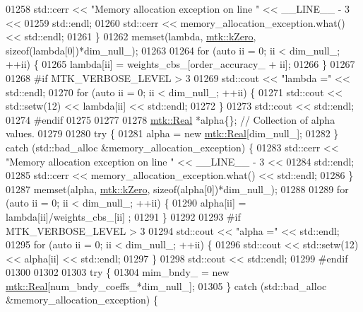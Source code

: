 \begin{DoxyCode}
{{01258     std::cerr << \textcolor{stringliteral}{"Memory allocation exception on line "} << \_\_LINE\_\_ - 3 <<
01259       std::endl;
01260     std::cerr << memory\_allocation\_exception.what() << std::endl;
01261   \}
01262   memset(lambda, \hyperlink{group__c01-roots_ga59a451a5fae30d59649bcda274fea271}{mtk::kZero}, \textcolor{keyword}{sizeof}(lambda[0])*dim\_null\_);
01263 
01264   \textcolor{keywordflow}{for} (\textcolor{keyword}{auto} ii = 0; ii < dim\_null\_; ++ii) \{
01265     lambda[ii] = weights\_cbs\_[order\_accuracy\_ + ii];
01266   \}
01267 
01268 \textcolor{preprocessor}{  #if MTK\_VERBOSE\_LEVEL > 3}
01269   std::cout << \textcolor{stringliteral}{"lambda ="} << std::endl;
01270   \textcolor{keywordflow}{for} (\textcolor{keyword}{auto} ii = 0; ii < dim\_null\_; ++ii) \{
01271     std::cout << std::setw(12) << lambda[ii] << std::endl;
01272   \}
01273   std::cout << std::endl;
01274 \textcolor{preprocessor}{  #endif}
01275 
01277 
01278   \hyperlink{group__c01-roots_gac080bbbf5cbb5502c9f00405f894857d}{mtk::Real} *alpha\{\}; \textcolor{comment}{// Collection of alpha values.}
01279 
01280   \textcolor{keywordflow}{try} \{
01281     alpha = \textcolor{keyword}{new} \hyperlink{group__c01-roots_gac080bbbf5cbb5502c9f00405f894857d}{mtk::Real}[dim\_null\_];
01282   \} \textcolor{keywordflow}{catch} (std::bad\_alloc &memory\_allocation\_exception) \{
01283     std::cerr << \textcolor{stringliteral}{"Memory allocation exception on line "} << \_\_LINE\_\_ - 3 <<
01284       std::endl;
01285     std::cerr << memory\_allocation\_exception.what() << std::endl;
01286   \}
01287   memset(alpha, \hyperlink{group__c01-roots_ga59a451a5fae30d59649bcda274fea271}{mtk::kZero}, \textcolor{keyword}{sizeof}(alpha[0])*dim\_null\_);
01288 
01289   \textcolor{keywordflow}{for} (\textcolor{keyword}{auto} ii = 0; ii < dim\_null\_; ++ii) \{
01290     alpha[ii] = lambda[ii]/weights\_cbs\_[ii] ;
01291   \}
01292 
01293 \textcolor{preprocessor}{  #if MTK\_VERBOSE\_LEVEL > 3}
01294   std::cout << \textcolor{stringliteral}{"alpha ="} << std::endl;
01295   \textcolor{keywordflow}{for} (\textcolor{keyword}{auto} ii = 0; ii < dim\_null\_; ++ii) \{
01296     std::cout << std::setw(12) << alpha[ii] << std::endl;
01297   \}
01298   std::cout << std::endl;
01299 \textcolor{preprocessor}{  #endif}
01300 
01302 
01303   \textcolor{keywordflow}{try} \{
01304     mim\_bndy\_ = \textcolor{keyword}{new} \hyperlink{group__c01-roots_gac080bbbf5cbb5502c9f00405f894857d}{mtk::Real}[num\_bndy\_coeffs\_*dim\_null\_];
01305   \} \textcolor{keywordflow}{catch} (std::bad\_alloc &memory\_allocation\_exception) \{
}}
\end{DoxyCode}
